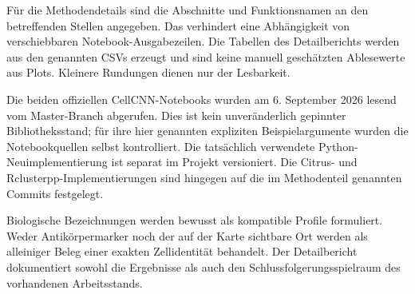 \documentclass[11pt,a4paper]{article}
\begin{document}
Für die Methodendetails sind die Abschnitte und Funktionsnamen an den
betreffenden Stellen angegeben. Das verhindert eine Abhängigkeit von
verschiebbaren Notebook-Ausgabezeilen. Die Tabellen des Detailberichts
werden aus den genannten CSVs erzeugt und sind keine manuell geschätzten
Ablesewerte aus Plots. Kleinere Rundungen dienen nur der Lesbarkeit.

Die beiden offiziellen CellCNN-Notebooks wurden am 6. September 2026
lesend vom Master-Branch abgerufen. Dies ist kein unveränderlich gepinnter
Bibliotheksstand; für ihre hier genannten expliziten Beispielargumente
wurden die Notebookquellen selbst kontrolliert. Die tatsächlich
verwendete Python-Neuimplementierung ist separat im Projekt versioniert.
Die Citrus- und Rclusterpp-Implementierungen sind hingegen auf die im
Methodenteil genannten Commits festgelegt.

Biologische Bezeichnungen werden bewusst als kompatible Profile
formuliert. Weder Antikörpermarker noch der auf der Karte sichtbare Ort
werden als alleiniger Beleg einer exakten Zellidentität behandelt.
Der Detailbericht dokumentiert sowohl die Ergebnisse als auch den
Schlussfolgerungsspielraum des vorhandenen Arbeitsstands.
\end{document}
